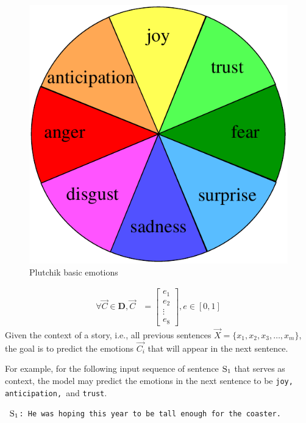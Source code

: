 \documentclass[letterpaper]{article}
\begin{document}
\begin{figure}
    \centering
    \includegraphics[width = 0.5\linewidth]{figure/plutchikWheel.pdf}
    \caption{Plutchik basic emotions}
    \label{fig:plutchikLabel}
\end{figure}
\begin{align}
    \forall \vec{C} \in \mathbf{D}, \vec{C} &= \begin{bmatrix}
                                                e_{1} \\
                                                e_{2} \\
                                                \vdots \\
                                                e_{8}
                                                \end{bmatrix}, 
    e \in [0, 1]
\end{align}
\noindent Given the context of a story, i.e., all previous sentences $\vec{X} = \{x_1, x_2, x_3, \dots, x_m\}$, the goal is to predict the emotions $\vec{C_i}$ that will appear in the next sentence. 



For example, for the following input sequence of sentence $\textsc{S}_1$ that serves as context, the model may predict the emotions in the next sentence to be \texttt{joy, anticipation, }and \texttt{trust}.

\begin{center}
    \texttt{
    $\textsc{S}_1$: He was hoping this year to be tall enough for the coaster.
    }
\end{center}
\end{document}
